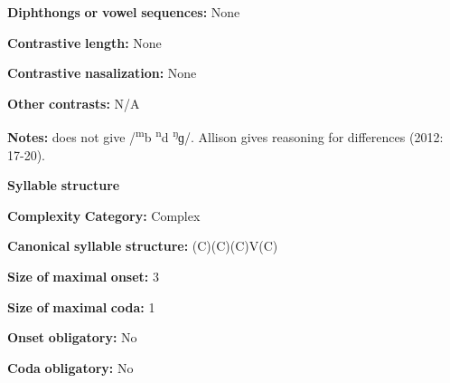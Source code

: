 \begin{styleBody}
\textbf{Diphthongs} \textbf{or} \textbf{vowel} \textbf{sequences:} None
\end{styleBody}

\begin{styleBody}
\textbf{Contrastive} \textbf{length:} None
\end{styleBody}

\begin{styleBody}
\textbf{Contrastive} \textbf{nasalization:} None
\end{styleBody}

\begin{styleBody}
\textbf{Other} \textbf{contrasts:} N/A
\end{styleBody}

\begin{styleBody}
\textbf{Notes:} \citet{Mahamat2005} does not give /\textsuperscript{m}b \textsuperscript{n}d \textsuperscript{ŋ}ɡ/. Allison gives reasoning for differences (2012: 17-20).
\end{styleBody}

\begin{styleBody}
\textbf{Syllable} \textbf{structure}
\end{styleBody}

\begin{styleBody}
\textbf{Complexity} \textbf{Category:} Complex
\end{styleBody}

\begin{styleBody}
\textbf{Canonical} \textbf{syllable} \textbf{structure:} (C)(C)(C)V(C) \citep[23-24]{Allison2012}
\end{styleBody}

\begin{styleBody}
\textbf{Size} \textbf{of} \textbf{maximal} \textbf{onset:} 3
\end{styleBody}

\begin{styleBody}
\textbf{Size} \textbf{of} \textbf{maximal} \textbf{coda:} 1
\end{styleBody}

\begin{styleBody}
\textbf{Onset} \textbf{obligatory:} No
\end{styleBody}

\begin{styleBody}
\textbf{Coda} \textbf{obligatory:} No
\end{styleBody}

